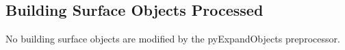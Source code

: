 \subsection{Building Surface Objects Processed}\label{building-surface-objects-processed}

No building surface objects are modified by the pyExpandObjects preprocessor.